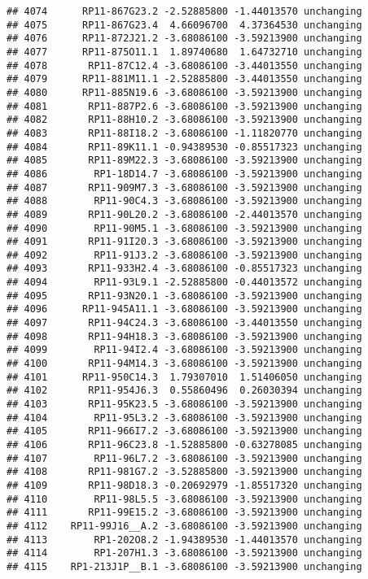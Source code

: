 \documentclass[]{article}
\begin{document}
\begin{verbatim}
## 4074      RP11-867G23.2 -2.52885800 -1.44013570 unchanging
## 4075      RP11-867G23.4  4.66096700  4.37364530 unchanging
## 4076      RP11-872J21.2 -3.68086100 -3.59213900 unchanging
## 4077      RP11-875O11.1  1.89740680  1.64732710 unchanging
## 4078       RP11-87C12.4 -3.68086100 -3.44013550 unchanging
## 4079      RP11-881M11.1 -2.52885800 -3.44013550 unchanging
## 4080      RP11-885N19.6 -3.68086100 -3.59213900 unchanging
## 4081       RP11-887P2.6 -3.68086100 -3.59213900 unchanging
## 4082       RP11-88H10.2 -3.68086100 -3.59213900 unchanging
## 4083       RP11-88I18.2 -3.68086100 -1.11820770 unchanging
## 4084       RP11-89K11.1 -0.94389530 -0.85517323 unchanging
## 4085       RP11-89M22.3 -3.68086100 -3.59213900 unchanging
## 4086        RP1-18D14.7 -3.68086100 -3.59213900 unchanging
## 4087       RP11-909M7.3 -3.68086100 -3.59213900 unchanging
## 4088        RP11-90C4.3 -3.68086100 -3.59213900 unchanging
## 4089       RP11-90L20.2 -3.68086100 -2.44013570 unchanging
## 4090        RP11-90M5.1 -3.68086100 -3.59213900 unchanging
## 4091       RP11-91I20.3 -3.68086100 -3.59213900 unchanging
## 4092        RP11-91J3.2 -3.68086100 -3.59213900 unchanging
## 4093       RP11-933H2.4 -3.68086100 -0.85517323 unchanging
## 4094        RP11-93L9.1 -2.52885800 -0.44013572 unchanging
## 4095       RP11-93N20.1 -3.68086100 -3.59213900 unchanging
## 4096      RP11-945A11.1 -3.68086100 -3.59213900 unchanging
## 4097       RP11-94C24.3 -3.68086100 -3.44013550 unchanging
## 4098       RP11-94H18.3 -3.68086100 -3.59213900 unchanging
## 4099        RP11-94I2.4 -3.68086100 -3.59213900 unchanging
## 4100       RP11-94M14.3 -3.68086100 -3.59213900 unchanging
## 4101      RP11-950C14.3  1.79307010  1.51406050 unchanging
## 4102       RP11-954J6.3  0.55860496  0.26030394 unchanging
## 4103       RP11-95K23.5 -3.68086100 -3.59213900 unchanging
## 4104        RP11-95L3.2 -3.68086100 -3.59213900 unchanging
## 4105       RP11-966I7.2 -3.68086100 -3.59213900 unchanging
## 4106       RP11-96C23.8 -1.52885800 -0.63278085 unchanging
## 4107        RP11-96L7.2 -3.68086100 -3.59213900 unchanging
## 4108       RP11-981G7.2 -3.52885800 -3.59213900 unchanging
## 4109       RP11-98D18.3 -0.20692979 -1.85517320 unchanging
## 4110        RP11-98L5.5 -3.68086100 -3.59213900 unchanging
## 4111       RP11-99E15.2 -3.68086100 -3.59213900 unchanging
## 4112    RP11-99J16__A.2 -3.68086100 -3.59213900 unchanging
## 4113        RP1-202O8.2 -1.94389530 -1.44013570 unchanging
## 4114        RP1-207H1.3 -3.68086100 -3.59213900 unchanging
## 4115    RP1-213J1P__B.1 -3.68086100 -3.59213900 unchanging

\end{verbatim}
\end{document}
